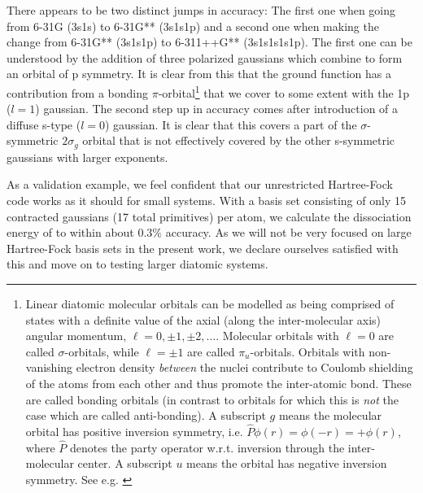 \documentclass[../../master.tex]{subfiles}
\begin{document}
There appears to be two distinct jumps in accuracy: The first one when going from 6-31G (3s1s) to 6-31G** (3s1s1p) and a second one when making the change from 6-31G** (3s1s1p) to 6-311++G** (3s1s1s1s1p). The first one can be understood by the addition of three polarized gaussians which combine to form an orbital of p symmetry. It is clear from this that the  ground function has a contribution from a bonding $\pi$-orbital\footnote{Linear diatomic molecular orbitals can be modelled as being comprised of states with a definite value of the axial (along the inter-molecular axis) angular momentum, $\ell=0,\pm1,\pm2,\dots$. Molecular orbitals with $\ell=0$ are called $\sigma$-orbitals, while $\ell=\pm1$ are called $\pi_u$-orbitals. Orbitals with non-vanishing electron density \emph{between} the nuclei contribute to Coulomb shielding of the atoms from each other and thus promote the inter-atomic bond. These are called bonding orbitals (in contrast to orbitals for which this is \emph{not} the case which are called anti-bonding). A subscript $g$ means the molecular orbital has positive inversion symmetry, i.e. $\hat P \phi(r)=\phi(-r) = +\phi(r)$, where $\hat P$ denotes the party operator w.r.t. inversion through the inter-molecular center. A subscript $u$ means the orbital has negative inversion symmetry. See e.g. \cite{zumdahl}} that we cover to some extent with the 1p ($l=1$) gaussian. The second step up in accuracy comes after introduction of a diffuse s-type ($l=0$) gaussian. It is clear that this covers a part of the $\sigma$-symmetric $2\sigma_g$ orbital that is not effectively covered by the other s-symmetric gaussians with larger exponents. 

As a validation example, we feel confident that our unrestricted Hartree-Fock code works as it should for small systems. With a basis set consisting of only 15 contracted gaussians (17 total primitives) per atom, we calculate the dissociation energy of  to within about $0.3\%$ accuracy. As we will not be very focused on large Hartree-Fock basis sets in the present work, we declare ourselves satisfied with this and move on to testing larger diatomic systems.
\end{document}
